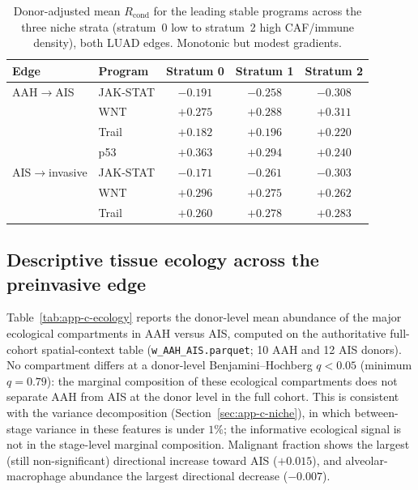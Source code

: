 \begin{table}[htbp]
  \centering
  \caption[Per-stratum conditional transport for leading programs]{Donor-adjusted mean
  $R_{\mathrm{cond}}$ for the leading stable programs across the three niche strata (stratum~0 low to
  stratum~2 high CAF/immune density), both LUAD edges. Monotonic but modest gradients.}
  \label{tab:app-c-niche}
  \footnotesize
  \begin{tabular}{llccc}
    \toprule
    Edge & Program & Stratum 0 & Stratum 1 & Stratum 2 \\
    \midrule
    AAH$\rightarrow$AIS      & JAK-STAT & $-0.191$ & $-0.258$ & $-0.308$ \\
                             & WNT      & $+0.275$ & $+0.288$ & $+0.311$ \\
                             & Trail    & $+0.182$ & $+0.196$ & $+0.220$ \\
                             & p53      & $+0.363$ & $+0.294$ & $+0.240$ \\
    \midrule
    AIS$\rightarrow$invasive & JAK-STAT & $-0.171$ & $-0.261$ & $-0.303$ \\
                             & WNT      & $+0.296$ & $+0.275$ & $+0.262$ \\
                             & Trail    & $+0.260$ & $+0.278$ & $+0.283$ \\
    \bottomrule
  \end{tabular}
\end{table}

\subsection{Descriptive tissue ecology across the preinvasive edge}
\label{sec:app-c-ecology}

Table~\ref{tab:app-c-ecology} reports the donor-level mean abundance of the major ecological
compartments in AAH versus AIS, computed on the authoritative full-cohort spatial-context table
(\texttt{w\_AAH\_AIS.parquet}; 10 AAH and 12 AIS donors). No compartment differs at a donor-level
Benjamini--Hochberg $q<0.05$ (minimum $q=0.79$): the marginal composition of these ecological
compartments does not separate AAH from AIS at the donor level in the full cohort. This is consistent
with the variance decomposition (Section~\ref{sec:app-c-niche}), in which between-stage variance in
these features is under $1\%$; the informative ecological signal is not in the stage-level marginal
composition. Malignant fraction shows the largest (still non-significant) directional increase toward
AIS ($+0.015$), and alveolar-macrophage abundance the largest directional decrease ($-0.007$).

